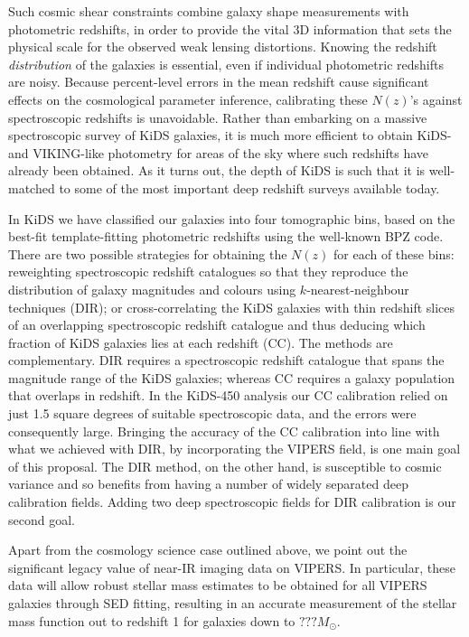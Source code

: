 \documentclass[a4paper, 10pt]{article}
\begin{document}
Such cosmic shear constraints combine galaxy shape measurements with photometric redshifts, in order to provide the vital 3D information that sets the physical scale for the observed weak lensing distortions. Knowing the redshift {\em distribution} of the galaxies is essential, even if individual photometric redshifts are noisy. Because percent-level errors in the mean redshift cause significant effects on the cosmological parameter inference, calibrating these $N(z)$'s against spectroscopic redshifts is unavoidable. Rather than embarking on a massive spectroscopic survey of KiDS galaxies, it is much more efficient to obtain KiDS- and VIKING-like photometry for areas of the sky where such redshifts have already been obtained. As it turns out, the depth of KiDS is such that it is well-matched to some of the most important deep redshift surveys available today.

In KiDS we have classified our galaxies into four tomographic bins, based on the best-fit template-fitting photometric redshifts using the well-known BPZ code. There are two possible strategies for obtaining the $N(z)$ for each of these bins: reweighting spectroscopic redshift catalogues so that they reproduce the distribution of galaxy magnitudes and colours using $k$-nearest-neighbour techniques (DIR); or cross-correlating the KiDS galaxies with thin redshift slices of an overlapping spectroscopic redshift catalogue and thus deducing which fraction of KiDS galaxies lies at each redshift (CC). The methods are complementary. DIR requires a spectroscopic redshift catalogue that spans the magnitude range of the KiDS galaxies; whereas CC requires a galaxy population that overlaps in redshift. In the KiDS-450 analysis our CC calibration relied on just 1.5 square degrees of suitable spectroscopic data, and the errors were consequently large. Bringing the accuracy of the CC calibration into line with what we achieved with DIR, by incorporating the VIPERS field, is one main goal of this proposal. The DIR method, on the other hand, is susceptible to cosmic variance and so benefits from having a number of widely separated deep calibration fields. Adding two deep spectroscopic fields for DIR calibration is our second goal.

Apart from the cosmology science case outlined above, we point out the significant legacy value of near-IR imaging data on VIPERS. In particular, these data will allow robust stellar mass estimates to be obtained for all VIPERS galaxies through SED fitting, resulting in an accurate measurement of the stellar mass function out to redshift 1 for galaxies down to $???M_\odot$.
\end{document}
